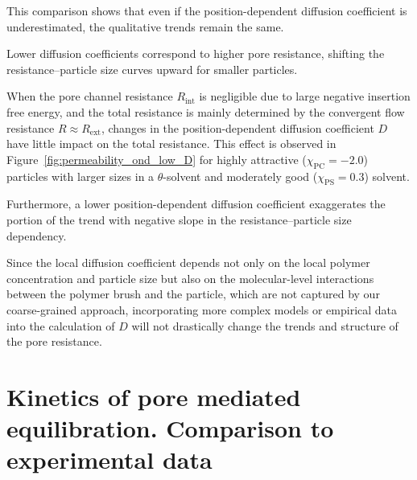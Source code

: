 \documentclass[10pt, a4paper]{article}
\begin{document}
\begin{multicols}{2}
This comparison shows that even if the position-dependent diffusion coefficient is underestimated, the qualitative trends remain the same.

Lower diffusion coefficients correspond to higher pore resistance, shifting the resistance–particle size curves upward for smaller particles.

When the pore channel resistance $R_{\text{int}}$ is negligible due to large negative insertion free energy, and the total resistance is mainly determined by the convergent flow resistance $R \approx R_{\text{ext}}$, changes in the position-dependent diffusion coefficient $D$ have little impact on the total resistance. This effect is observed in Figure~\ref{fig:permeability_ond_low_D} for highly attractive ($\chi_{\text{PC}} = -2.0$) particles with larger sizes in a $\theta$-solvent and moderately good ($\chi_{\text{PS}} = 0.3$) solvent.

Furthermore, a lower position-dependent diffusion coefficient exaggerates the portion of the trend with negative slope in the resistance–particle size dependency.

Since the local diffusion coefficient depends not only on the local polymer concentration and particle size but also on the molecular-level interactions between the polymer brush and the particle, which are not captured by our coarse-grained approach, incorporating more complex models or empirical data into the calculation of $D$ will not drastically change the trends and structure of the pore resistance.


\end{multicols}




\section{Kinetics of pore mediated equilibration. Comparison to experimental data}
\end{document}
